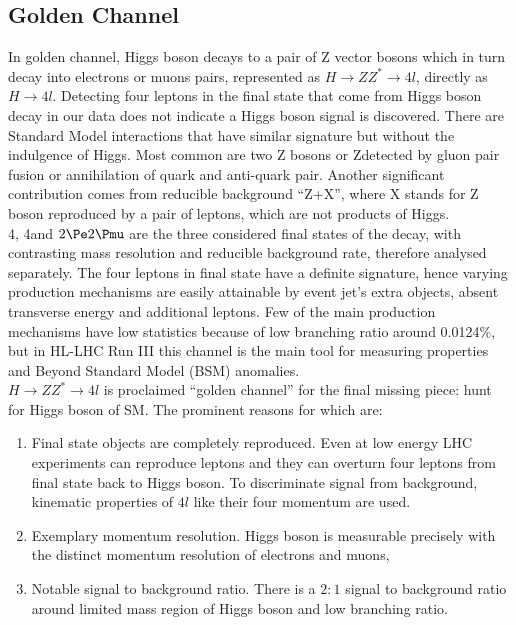 \subsection{Golden Channel}
\label{subsection:gc}
In golden channel, Higgs boson decays to a pair of Z vector bosons which in turn decay into electrons or muons pairs, represented as $H\rightarrow ZZ^{\ast}\rightarrow 4l$, directly as $H\rightarrow4l$. Detecting four leptons in the final state that come from Higgs boson decay in our data does not indicate a Higgs boson signal is discovered. There are Standard Model interactions that have similar signature but without the indulgence of Higgs. Most common are two Z bosons or Z\Pgammastar detected by gluon pair fusion or annihilation of quark and anti-quark pair. Another significant contribution comes from reducible background ``Z+X'', where X stands for Z boson reproduced by a pair of leptons, which are not products of Higgs.\\
4\Pe, 4\Pmu and $2\Pe2\Pmu$ are the three considered final states of the decay, with contrasting mass resolution and reducible background rate, therefore analysed separately. The four leptons in final state have a definite signature, hence varying production mechanisms are easily attainable by event jet's extra objects, absent transverse energy and additional leptons. Few of the main production mechanisms have low statistics because of low branching ratio around 0.0124\%, but in HL-LHC Run III this channel is the main tool for measuring properties and Beyond Standard Model (BSM) anomalies.\\
$H\rightarrow ZZ^{\ast}\rightarrow 4l$ is proclaimed ``golden channel'' for the final missing piece: hunt for Higgs boson of SM. The prominent reasons for which are:
\begin{enumerate}
    \item Final state objects are completely reproduced. Even at low energy LHC experiments can reproduce leptons and they can overturn four leptons from final state back to Higgs boson. To discriminate signal from background, kinematic properties of $4l$ like their four momentum are used.
    \item Exemplary momentum resolution. Higgs boson is measurable precisely with the distinct momentum resolution of electrons and muons,
    \item Notable signal to background ratio. There is a $2:1$ signal to background ratio around limited mass region of Higgs boson and low branching ratio.
\end{enumerate}
